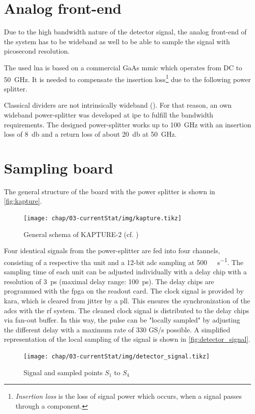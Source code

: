\section{Analog front-end}
Due to the high bandwidth nature of the detector signal, the analog front-end of the system has to be wideband as well to be able to sample the signal with picosecond resolution. 

The used \gls{lna} is based on a commercial GaAs \gls{mmic} which operates from DC to \SI{50}{\giga \hertz}. It is needed to compensate the insertion loss\footnote{\textit{Insertion loss} is the loss of signal power which occurs, when a signal passes through a component.} due to the following power splitter. %

Classical dividers are not intrinsically wideband (\cite{caselle2014}). For that reason, an own wideband power-splitter was developed at \gls{ipe} to fulfill the bandwidth requirements. The designed power-splitter works up to \SI{100}{\giga \hertz} with an insertion loss of \SI{8}{\decibel} and a return loss of about \SI{20}{\decibel} at \SI{50}{\giga \hertz}.\cite{caselle2014}

\section{Sampling board}
The general structure of the board with the power splitter is shown in \autoref{fig:kapture}. 
\begin{figure}[tbh]
	\centering
	\texttt{[image: chap/03-currentStat/img/kapture.tikz]}
	\caption{General schema of KAPTURE-2 (cf. \cite[p.2]{caselleKAP})}
	\label{fig:kapture}
\end{figure}

Four identical signals from the power-splitter are fed into four channels, consisting of a respective \gls{tha} unit and a 12-bit \gls{adc} sampling at \SI{500}{\mega\sample\per\second}. The sampling time of each unit can be adjusted individually with a delay chip with a resolution of \SI{3}{\pico \second} (maximal delay range: \SI{100}{\pico \second}). The delay chips are programmed with the \gls{fpga} on the readout card.
The clock signal is provided by \gls{kara}, which is cleared from jitter by a \gls{pll}. This ensures the synchronization of the \glspl{adc} with the \gls{rf} system. The cleaned clock signal is distributed to the delay chips via fan-out buffer. \cite{caselleKAP}
In this way, the pulse can be "locally sampled" by adjusting the different delay with a maximum rate of 330 GS/s possible. 
A simplified representation of the local sampling of the signal is shown in \autoref{fig:detector_signal}.
\begin{figure}[tbh]
	\centering
	\texttt{[image: chap/03-currentStat/img/detector\_signal.tikz]}
	\caption{Signal and sampled points $S_1$ to $S_4$}
	\label{fig:detector_signal}
\end{figure}

